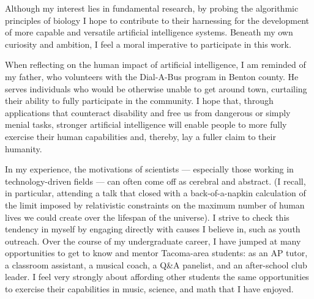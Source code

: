 Although my interest lies in fundamental research, by probing the algorithmic principles of biology I hope to contribute to their harnessing for the development of more capable and versatile artificial intelligence systems.
Beneath my own curiosity and ambition, I feel a moral imperative to participate in this work.

When reflecting on the human impact of artificial intelligence, I am reminded of my father, who volunteers with the Dial-A-Bus program in Benton county.
He serves individuals who would be otherwise unable to get around town, curtailing their ability to fully participate in the community.
I hope that, through applications that counteract disability and free us from dangerous or simply menial tasks, stronger artificial intelligence will enable people to more fully exercise their human capabilities and, thereby, lay a fuller claim to their humanity.

In my experience, the motivations of scientists --- especially those working in technology-driven fields --- can often come off as cerebral and abstract.
(I recall, in particular, attending a talk that closed with a back-of-a-napkin calculation of the limit imposed by relativistic constraints on the maximum number of human lives we could create over the lifespan of the universe).
I strive to check this tendency in myself by engaging directly with causes I believe in, such as youth outreach.
Over the course of my undergraduate career, I have jumped at many opportunities to get to know and mentor Tacoma-area students: as an AP tutor, a classroom assistant, a musical coach, a Q\&A panelist, and an after-school club leader.
I feel very strongly about affording other students the same opportunities to exercise their capabilities in music, science, and math that I have enjoyed.
